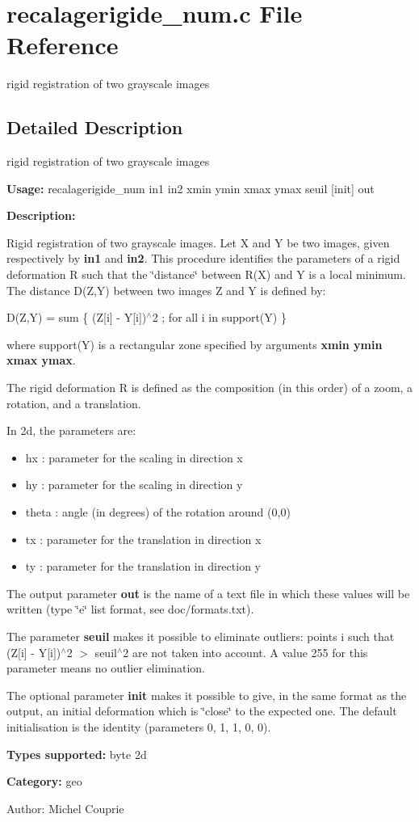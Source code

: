 \section{recalagerigide\_\-num.c File Reference}
\label{recalagerigide__num_8c}
rigid registration of two grayscale images  




\label{_details}
\subsection{Detailed Description}
rigid registration of two grayscale images 

{\bf Usage:} recalagerigide\_\-num in1 in2 xmin ymin xmax ymax seuil [init] out

{\bf Description:}

Rigid registration of two grayscale images. Let X and Y be two images, given respectively by {\bf in1} and {\bf in2}. This procedure identifies the parameters of a rigid deformation R such that the \char`\"{}distance\char`\"{} between R(X) and Y is a local minimum. The distance D(Z,Y) between two images Z and Y is defined by:

D(Z,Y) = sum \{ (Z[i] - Y[i])$^\wedge$2 ; for all i in support(Y) \}

where support(Y) is a rectangular zone specified by arguments {\bf xmin ymin xmax ymax}.

The rigid deformation R is defined as the composition (in this order) of a zoom, a rotation, and a translation.

In 2d, the parameters are: \begin{itemize}
\item hx : parameter for the scaling in direction x \item hy : parameter for the scaling in direction y \item theta : angle (in degrees) of the rotation around (0,0) \item tx : parameter for the translation in direction x \item ty : parameter for the translation in direction y\end{itemize}
The output parameter {\bf out} is the name of a text file in which these values will be written (type \char`\"{}e\char`\"{} list format, see doc/formats.txt).

The parameter {\bf seuil} makes it possible to eliminate outliers: points i such that (Z[i] - Y[i])$^\wedge$2 $>$ seuil$^\wedge$2 are not taken into account. A value 255 for this parameter means no outlier elimination.

The optional parameter {\bf init} makes it possible to give, in the same format as the output, an initial deformation which is \char`\"{}close\char`\"{} to the expected one. The default initialisation is the identity (parameters 0, 1, 1, 0, 0).

{\bf Types supported:} byte 2d

{\bf Category:} geo

\begin{Desc}
\item[Author:]Michel Couprie \end{Desc}
